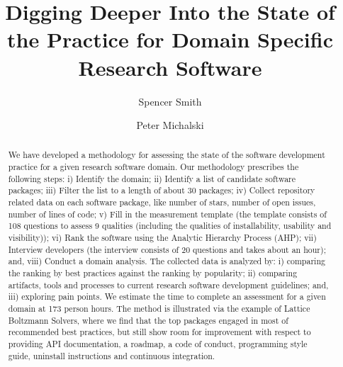 \documentclass[runningheads]{llncs}
\begin{document}
%
\title{Digging Deeper Into the State of the Practice for Domain Specific Research Software}
%
\author{Spencer Smith \and
Peter Michalski}%
%
%
%
\maketitle %
%
\begin{abstract}

	We have developed a methodology for assessing the state of the software
	development practice for a given research software domain. Our methodology
	prescribes the following steps: i) Identify the domain; ii) Identify a list
	of candidate software packages; iii) Filter the list to a length of about 30
	packages; iv) Collect repository related data on each software package, like
	number of stars, number of open issues, number of lines of code; v) Fill in
	the measurement template (the template consists of 108 questions to assess 9
	qualities (including the qualities of installability, usability and
	visibility)); vi) Rank the software using the Analytic Hierarchy Process
	(AHP); vii) Interview developers (the interview consists of 20 questions and
	takes about an hour); and, viii) Conduct a domain analysis. The collected
	data is analyzed by: i) comparing the ranking by best practices against 
	the ranking by popularity; ii) comparing artifacts, tools and processes to
	current research software development guidelines; and, iii) exploring pain
	points. We estimate the time to complete an assessment for a given domain at
	173 person hours. The method is illustrated via the example of Lattice
	Boltzmann Solvers, where we find that the top packages engaged in most of
	recommended best practices, but still show room for improvement with respect
	to providing API documentation, a roadmap, a code of conduct, programming
	style guide, uninstall instructions and continuous integration.


\end{abstract}
\end{document}
